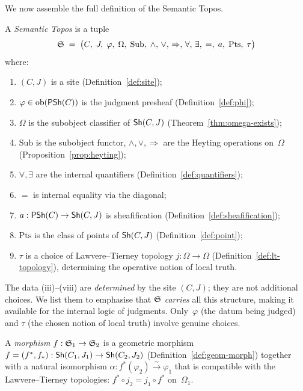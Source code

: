 We now assemble the full definition of the Semantic Topos.

\begin{definition}
\label{def:stop}
A \emph{Semantic Topos} is a tuple
\[
  \mathfrak{S} \;=\;
  \bigl(C,\; J,\; \varphi,\; \Omega,\; \mathrm{Sub},\;
  \wedge,\, \vee,\, \Rightarrow,\,
  \forall,\, \exists,\; {=},\;
  a,\; \mathrm{Pts},\; \tau \bigr)
\]
where:
\begin{enumerate}[label=(\roman*),nosep]
\item $(C,J)$ is a site (Definition~\ref{def:site});
\item $\varphi \in \mathrm{ob}(\mathsf{PSh}(C))$ is the judgment presheaf
  (Definition~\ref{def:phi});
\item $\Omega$ is the subobject classifier of $\mathsf{Sh}(C,J)$
  (Theorem~\ref{thm:omega-exists});
\item $\mathrm{Sub}$ is the subobject functor,
  $\wedge, \vee, \Rightarrow$ are the Heyting operations on~$\Omega$
  (Proposition~\ref{prop:heyting});
\item $\forall, \exists$ are the internal quantifiers
  (Definition~\ref{def:quantifiers});
\item ${=}$ is internal equality via the diagonal;
\item $a : \mathsf{PSh}(C) \to \mathsf{Sh}(C,J)$ is sheafification
  (Definition~\ref{def:sheafification});
\item $\mathrm{Pts}$ is the class of points of $\mathsf{Sh}(C,J)$
  (Definition~\ref{def:point});
\item $\tau$ is a choice of Lawvere--Tierney topology
  $j : \Omega \to \Omega$ (Definition~\ref{def:lt-topology}),
  determining the operative notion of local truth.
\end{enumerate}
\end{definition}

\begin{remark}
The data (iii)--(viii) are \emph{determined} by the site $(C,J)$; they
are not additional choices.  We list them to emphasise that $\mathfrak{S}$
\emph{carries} all this structure, making it available for the internal
logic of judgments.  Only~$\varphi$ (the datum being judged) and
$\tau$ (the chosen notion of local truth) involve genuine choices.
\end{remark}

\begin{definition}
\label{def:stop-morph}
A \emph{morphism} $f : \mathfrak{S}_1 \to \mathfrak{S}_2$ is a geometric morphism
$f = (f^*,f_*) : \mathsf{Sh}(C_1,J_1) \to \mathsf{Sh}(C_2,J_2)$
(Definition~\ref{def:geom-morph}) together with a natural isomorphism
$\alpha : f^*(\varphi_2) \xrightarrow{\;\sim\;} \varphi_1$ that is
compatible with the Lawvere--Tierney topologies:
$f^* \circ j_2 = j_1 \circ f^*$ on~$\Omega_1$.
\end{definition}

